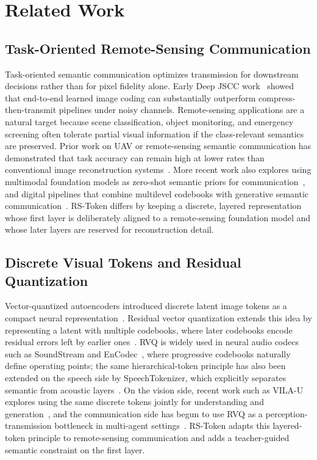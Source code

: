 \documentclass[lettersize,journal]{IEEEtran}
\begin{document}
\section{Related Work}
\subsection{Task-Oriented Remote-Sensing Communication}
Task-oriented semantic communication optimizes transmission for downstream decisions rather than for pixel fidelity alone. Early Deep JSCC work~\cite{deepjscc} showed that end-to-end learned image coding can substantially outperform compress-then-transmit pipelines under noisy channels. Remote-sensing applications are a natural target because scene classification, object monitoring, and emergency screening often tolerate partial visual information if the class-relevant semantics are preserved. Prior work on UAV or remote-sensing semantic communication has demonstrated that task accuracy can remain high at lower rates than conventional image reconstruction systems~\cite{gao2022task}. More recent work also explores using multimodal foundation models as zero-shot semantic priors for communication~\cite{semclip}, and digital pipelines that combine multilevel codebooks with generative semantic communication~\cite{moc-rvq}. RS-Token differs by keeping a discrete, layered representation whose first layer is deliberately aligned to a remote-sensing foundation model and whose later layers are reserved for reconstruction detail.

\subsection{Discrete Visual Tokens and Residual Quantization}
Vector-quantized autoencoders introduced discrete latent image tokens as a compact neural representation~\cite{vqvae}. Residual vector quantization extends this idea by representing a latent with multiple codebooks, where later codebooks encode residual errors left by earlier ones~\cite{lee2022residual}. RVQ is widely used in neural audio codecs such as SoundStream and EnCodec~\cite{soundstream,encodec}, where progressive codebooks naturally define operating points; the same hierarchical-token principle has also been extended on the speech side by SpeechTokenizer, which explicitly separates semantic from acoustic layers~\cite{zhang2024speechtokenizer}. On the vision side, recent work such as VILA-U explores using the same discrete tokens jointly for understanding and generation~\cite{vilau}, and the communication side has begun to use RVQ as a perception-transmission bottleneck in multi-agent settings~\cite{revqom}. RS-Token adapts this layered-token principle to remote-sensing communication and adds a teacher-guided semantic constraint on the first layer.
\end{document}
